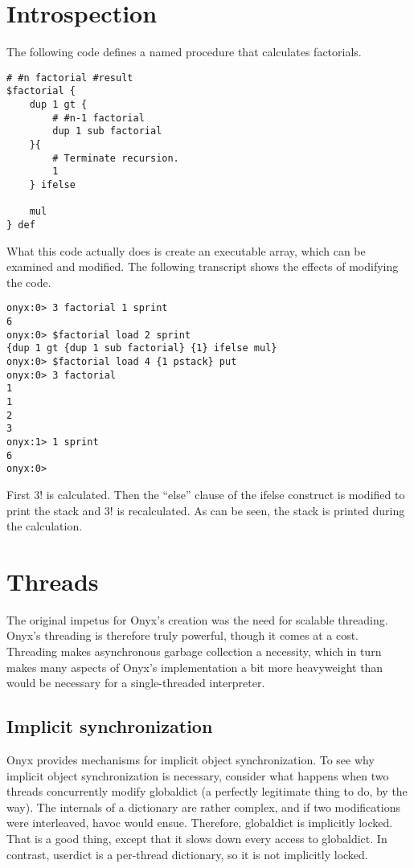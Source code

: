 \section{Introspection}
\label{onyxtut:introspection}

The following code defines a named procedure that calculates factorials.

\begin{verbatim}
# #n factorial #result
$factorial {
    dup 1 gt {
        # #n-1 factorial
        dup 1 sub factorial
    }{
        # Terminate recursion.
        1
    } ifelse

    mul
} def
\end{verbatim}

What this code actually does is create an executable array, which can be
examined and modified.  The following transcript shows the effects of modifying
the code.

\begin{verbatim}
onyx:0> 3 factorial 1 sprint
6
onyx:0> $factorial load 2 sprint
{dup 1 gt {dup 1 sub factorial} {1} ifelse mul}
onyx:0> $factorial load 4 {1 pstack} put
onyx:0> 3 factorial 
1
1
2
3
onyx:1> 1 sprint
6
onyx:0>
\end{verbatim}

First $3!$ is calculated.  Then the ``else'' clause of the ifelse construct is
modified to print the stack and $3!$ is recalculated.  As can be seen, the stack
is printed during the calculation.

\section{Threads}

The original impetus for Onyx's creation was the need for scalable threading.
Onyx's threading is therefore truly powerful, though it comes at a cost.
Threading makes asynchronous garbage collection a necessity, which in turn makes
many aspects of Onyx's implementation a bit more heavyweight than would be
necessary for a single-threaded interpreter.

\subsection{Implicit synchronization}

Onyx provides mechanisms for implicit object synchronization.  To see why
implicit object synchronization is necessary, consider what happens when two
threads concurrently modify globaldict (a perfectly legitimate thing to do, by
the way).  The internals of a dictionary are rather complex, and if two
modifications were interleaved, havoc would ensue.  Therefore, globaldict is
implicitly locked.  That is a good thing, except that it slows down every access
to globaldict.  In contrast, userdict is a per-thread dictionary, so it is not
implicitly locked.

